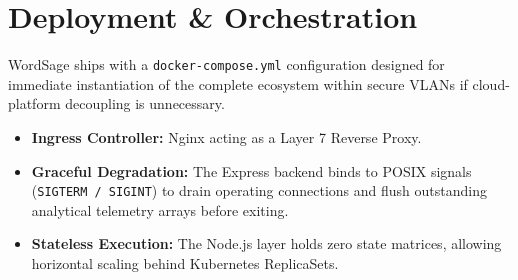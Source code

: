 \documentclass[12pt,a4paper]{report}
\begin{document}
\chapter{Deployment \& Orchestration}

WordSage ships with a \texttt{docker-compose.yml} configuration designed for immediate instantiation of the complete ecosystem within secure VLANs if cloud-platform decoupling is unnecessary.

\begin{itemize}
    \item \textbf{Ingress Controller:} Nginx acting as a Layer 7 Reverse Proxy.
    \item \textbf{Graceful Degradation:} The Express backend binds to POSIX signals (\texttt{SIGTERM / SIGINT}) to drain operating connections and flush outstanding analytical telemetry arrays before exiting.
    \item \textbf{Stateless Execution:} The Node.js layer holds zero state matrices, allowing horizontal scaling behind Kubernetes ReplicaSets.
\end{itemize}
\end{document}
